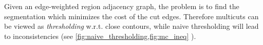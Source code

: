 Given an edge-weighted region adjacency graph,
the problem is to find the segmentation which
minimizes the cost of the cut edges.
Therefore multicuts can be viewed as \emph{thresholding} w.r.t. close contours, while
naive thresholding will lead to inconsistencies 
(see \cref{fig:naive_thresholding,fig:mc_ineq} ).


\begin{figure}[h]
    \centering
\end{figure}
